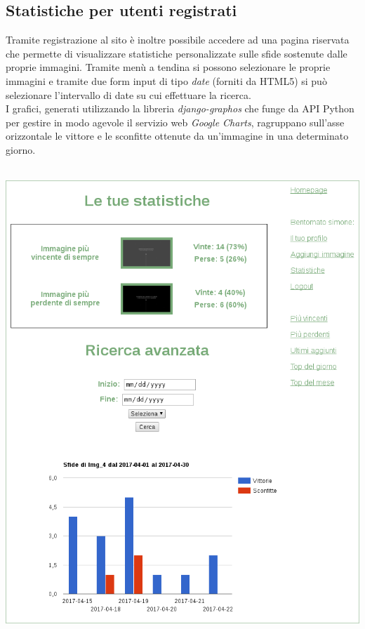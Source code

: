 \documentclass{scrreprt}
\begin{document}
\subsection{Statistiche per utenti registrati}
Tramite registrazione al sito è inoltre possibile accedere ad una pagina riservata che permette di visualizzare statistiche personalizzate sulle sfide sostenute dalle proprie immagini. Tramite menù a tendina si possono selezionare le proprie immagini e tramite due form input di tipo \textit{date} (forniti da HTML5) si può selezionare l'intervallo di date su cui effettuare la ricerca.\\
I grafici, generati utilizzando la libreria \textit{django-graphos} che funge da API Python per gestire in modo agevole il servizio web \textit{Google Charts}, ragruppano sull'asse orizzontale le vittore e le sconfitte ottenute da un'immagine in una determinato giorno. 
\\\\
\centerline{\includegraphics[scale=0.46]{stats}}
\pagebreak
\end{document}
